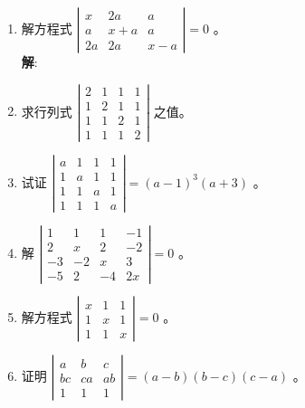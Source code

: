 \documentclass{report}
\newcommand{\sol}{\vspace{0.2cm}\textbf{解}:}
\begin{document}
\begin{enumerate}
  \item 解方程式 $\left|\begin{array}{ccc}x & 2 a & a \\ a & x+a & a \\ 2 a & 2 a & x-a\end{array}\right|=0$ 。\\

        \sol{}

  \item 求行列式 $\left|\begin{array}{llll}2 & 1 & 1 & 1 \\ 1 & 2 & 1 & 1 \\ 1 & 1 & 2 & 1 \\ 1 & 1 & 1 & 2\end{array}\right|$ 之值。\\
  \item 试证 $\left|\begin{array}{llll}a & 1 & 1 & 1 \\ 1 & a & 1 & 1 \\ 1 & 1 & a & 1 \\ 1 & 1 & 1 & a\end{array}\right|=(a-1)^{3}(a+3)$ 。\\
  \item 解 $\left|\begin{array}{rrrr}1 & 1 & 1 & -1 \\ 2 & x & 2 & -2 \\ -3 & -2 & x & 3 \\ -5 & 2 & -4 & 2 x\end{array}\right|=0$ 。\\
  \item 解方程式 $\left|\begin{array}{lll}x & 1 & 1 \\ 1 & x & 1 \\ 1 & 1 & x\end{array}\right|=0$ 。\\
  \item 证明 $\left|\begin{array}{ccc}a & b & c \\ b c & c a & a b \\ 1 & 1 & 1\end{array}\right|=(a-b)(b-c)(c-a)$ 。\\
\end{enumerate}
\end{document}
